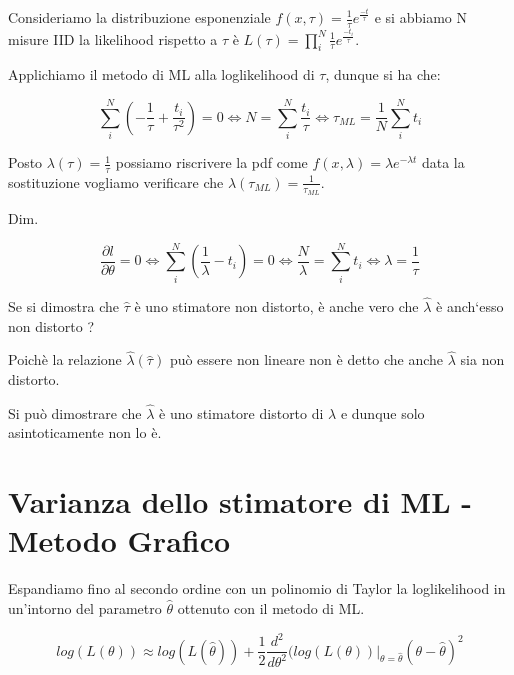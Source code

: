 \documentclass[11pt,a4paper]{book}
\begin{document}
Consideriamo la distribuzione esponenziale $f(x,\tau) = \frac{1}{\tau}e^{\frac{-t}{\tau}}$ e si abbiamo N misure IID la likelihood rispetto a $\tau$ \`{e} $L(\tau) = \prod_{i}^N \frac{1}{\tau}e^{\frac{-t_{i}}{\tau}}$.
\newline

\noindent Applichiamo il metodo di ML alla loglikelihood di $\tau$, dunque si ha che:

\begin{equation*}
		\sum_{i}^N(-\frac{1}{\tau}+ \frac{t_{i}}{\tau^2}) = 0 \iff N = \sum_{i}^N \frac{t_{i}}{\tau} \iff \tau_{ML} = \frac{1}{N} \sum_{i}^Nt_{i}
\end{equation*}

\noindent Posto $\lambda(\tau) = \frac{1}{\tau}$ possiamo riscrivere la pdf come $f(x,\lambda)= \lambda e^{-\lambda t}$ data la sostituzione vogliamo verificare che $\lambda(\tau_{ML}) = \frac{1}{\tau_{ML}}$.\newline


\noindent Dim.

\begin{equation*}
		\frac{\partial l}{\partial \theta} = 0 \iff \sum_{i}^N(\frac{1}{\lambda} - t_{i}) = 0 \iff \frac{N}{\lambda} = \sum_{i}^N t_{i} \iff \lambda = \frac{1}{\tau}
\end{equation*}

\noindent Se si dimostra che $\hat{\tau}$ \`{e} uno stimatore non distorto, \`{e} anche vero che $\hat{\lambda}$ \`{e} anch`esso non distorto ? \newline

Poich\`{e} la relazione $\hat{\lambda}(\hat{\tau})$ pu\`{o} essere non lineare non \`{e} detto che anche $\hat{\lambda}$ sia non distorto. 

\noindent Si pu\`{o} dimostrare che $\hat{\lambda}$ \`{e} uno stimatore distorto di $\lambda$ e dunque solo asintoticamente non lo \`{e}.

\section{Varianza dello stimatore di ML - Metodo Grafico}

Espandiamo fino al secondo ordine con un polinomio di Taylor la loglikelihood in un'intorno del parametro $\hat{\theta}$ ottenuto con il metodo di ML.

\begin{equation}
	log(L(\theta)) \approx log(L(\hat{\theta})) + \frac{1}{2}\frac{d^2}{d\theta^2}(log(L(\theta))\vert_{\theta = \hat{\theta}} (\theta - \hat{\theta})^2
\end{equation}
\end{document}
